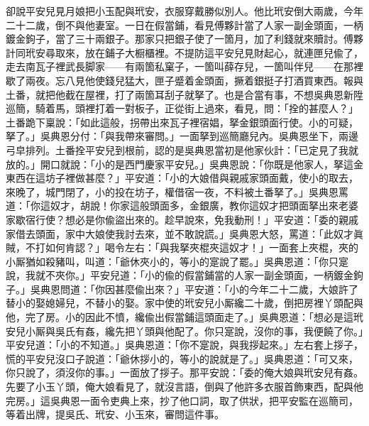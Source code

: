 卻說平安兒見月娘把小玉配與玳安，衣服穿戴勝似別人。他比玳安倒大兩歲，今年二十二歲，倒不與他妻室。一日在假當鋪，看見傅夥計當了人家一副金頭面，一柄鍍金鉤子，當了三十兩銀子。那家只把銀子使了一箇月，加了利錢就來贖討。傅夥計同玳安尋取來，放在鋪子大橱櫃裡。不提防這平安兒見財起心，就連匣兒偸了，走去南瓦子裡武長脚家——有兩箇私窠子，一箇叫薛存兒，一箇叫伴兒——在那裡歇了兩夜。忘八見他使錢兒猛大，匣子蹙着金頭面，撅着銀挺子打酒買東西。報與土番，就把他截在屋裡，打了兩箇耳刮子就拏了。也是合當有事，不想吳典恩新陞巡簡，騎着馬，頭裡打着一對板子，正從街上過來，看見，問：「拴的甚麼人？」土番跪下稟說：「如此這般，拐帶出來瓦子裡宿娼，拏金銀頭面行使。小的可疑，拏了。」吳典恩分付：「與我帶來審問。」一面拏到巡簡廳兒內。吳典恩坐下，兩邊弓皁排列。土番拴平安兒到根前，認的是吳典恩當初是他家伙計：「已定見了我就放的。」開口就說：「小的是西門慶家平安兒。」吳典恩說：「你既是他家人，拏這金東西在這坊子裡做甚麼？」平安道：「小的大娘借與親戚家頭面戴，使小的取去，來晚了，城門閉了，小的投在坊子，權借宿一夜，不料被土番拏了。」吳典恩罵道：「你這奴才，胡說！你家這般頭面多，金銀廣，教你這奴才把頭面拏出來老婆家歇宿行使？{}想必是你偸盜出來的。趁早說來，免我動刑！」平安道：「委的親戚家借去頭面，家中大娘使我討去來，並不敢說謊。」吳典恩大怒，罵道：「此奴才眞賊，不打如何肯認？」喝令左右：「與我拏夾棍夾這奴才！」一面套上夾棍，夾的小厮猶如殺豬叫，叫道：「爺休夾小的，等小的寔說了罷。」吳典恩道：「你只寔說，我就不夾你。」平安兒道：「小的偸的假當鋪當的人家一副金頭面，一柄鍍金鉤子。」吳典恩問道：「你因甚麼偸出來？」平安道：「小的今年二十二歲，大娘許了替小的娶媳婦兒，不替小的娶。家中使的玳安兒小厮纔二十歲，倒把房裡丫頭配與他，完了房。小的因此不憤，纔偸出假當鋪這頭面走了。」吳典恩道：「想必是這玳安兒小厮與吳氏有姦，纔先把丫頭與他配了。你只寔說，沒你的事，我便饒了你。」{}平安兒道：「小的不知道。」吳典恩道：「你不寔說，與我拶起來。」左右套上拶子，慌的平安兒沒口子說道：「爺休拶小的，等小的說就是了。」吳典恩道：「可又來，你只說了，須沒你的事。」一面放了拶子。那平安說：「委的俺大娘與玳安兒有姦。先要了小玉丫頭，俺大娘看見了，就沒言語，倒與了他許多衣服首飾東西，配與他完房。」這吳典恩一面令吏典上來，抄了他口詞，取了供狀，把平安監在巡簡司，等着出牌，提吳氏、玳安、小玉來，審問這件事。

